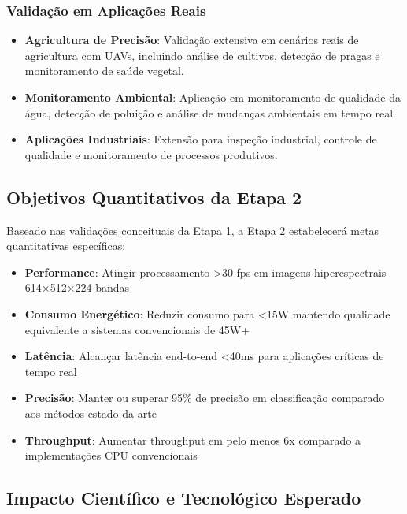 \subsubsection{Validação em Aplicações Reais}

\begin{itemize}
\item \textbf{Agricultura de Precisão}: Validação extensiva em cenários reais de agricultura com UAVs, incluindo análise de cultivos, detecção de pragas e monitoramento de saúde vegetal.

\item \textbf{Monitoramento Ambiental}: Aplicação em monitoramento de qualidade da água, detecção de poluição e análise de mudanças ambientais em tempo real.

\item \textbf{Aplicações Industriais}: Extensão para inspeção industrial, controle de qualidade e monitoramento de processos produtivos.
\end{itemize}

\subsection{Objetivos Quantitativos da Etapa 2}

Baseado nas validações conceituais da Etapa 1, a Etapa 2 estabelecerá metas quantitativas específicas:

\begin{itemize}
\item \textbf{Performance}: Atingir processamento >30 fps em imagens hiperespectrais 614×512×224 bandas
\item \textbf{Consumo Energético}: Reduzir consumo para <15W mantendo qualidade equivalente a sistemas convencionais de 45W+
\item \textbf{Latência}: Alcançar latência end-to-end <40ms para aplicações críticas de tempo real
\item \textbf{Precisão}: Manter ou superar 95\% de precisão em classificação comparado aos métodos estado da arte
\item \textbf{Throughput}: Aumentar throughput em pelo menos 6x comparado a implementações CPU convencionais
\end{itemize}

\subsection{Impacto Científico e Tecnológico Esperado}

